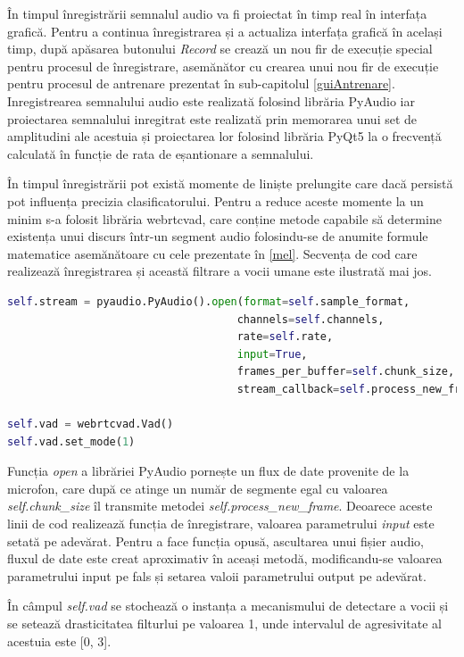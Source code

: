 \documentclass[a4paper,12pt]{book}
\begin{document}
		În timpul înregistrării semnalul audio va fi proiectat în timp real în interfața grafică. Pentru a continua înregistrarea și a actualiza interfața grafică în același timp, după apăsarea butonului \textit{Record} se crează un nou fir de execuție special pentru procesul de înregistrare, asemănător cu crearea unui nou fir de execuție pentru procesul de antrenare prezentat în sub-capitolul \ref{guiAntrenare}. Inregistrearea semnalului audio este realizată folosind librăria PyAudio iar proiectarea semnalului inregitrat este realizată prin memorarea unui set de amplitudini ale acestuia și proiectarea lor folosind librăria PyQt5 la o frecvență calculată în funcție de rata de eșantionare a semnalului. \par
		În timpul înregistrării pot există momente de liniște prelungite care dacă persistă pot influența precizia clasificatorului. Pentru a reduce aceste momente la un minim s-a folosit librăria webrtcvad, care conține metode capabile să determine existența unui discurs într-un segment audio folosindu-se de anumite formule matematice asemănătoare cu cele prezentate în \ref{mel}. Secvența de cod care realizează înregistrarea și această filtrare a vocii umane este ilustrată mai jos.
		\begin{lstlisting}[language=Python, caption={Initializarea fluxului de transmitere a datelor pentru inregistrarea}]	
self.stream = pyaudio.PyAudio().open(format=self.sample_format,
									channels=self.channels,
									rate=self.rate,
									input=True,
									frames_per_buffer=self.chunk_size, 
									stream_callback=self.process_new_frame)

self.vad = webrtcvad.Vad()
self.vad.set_mode(1) \end{lstlisting}
		Funcția \textit{open} a librăriei PyAudio pornește un flux de date provenite de la microfon, care după ce atinge un număr de segmente egal cu valoarea \textit{self.chunk\_size} îl transmite metodei \textit{self.process\_new\_frame}. Deoarece aceste linii de cod realizează funcția de înregistrare, valoarea parametrului \textit{input} este setată pe adevărat. Pentru a face funcția opusă, ascultarea unui fișier audio, fluxul de date este creat aproximativ în aceași metodă, modificandu-se valoarea parametrului input pe fals și setarea valoii parametrului output pe adevărat. \par
		
		În câmpul \textit{self.vad} se stochează o instanța a mecanismului de detectare a vocii și se setează drasticitatea filturlui pe valoarea 1, unde intervalul de agresivitate al acestuia este [0, 3]. \par
\end{document}
